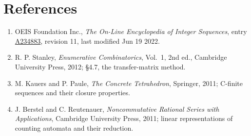 \documentclass[11pt]{article}
\theoremstyle{definition}
\begin{document}
\section{References}

\begin{enumerate}

\item OEIS Foundation Inc., \emph{The On-Line Encyclopedia of Integer Sequences}, entry \href{https://oeis.org/A234883}{A234883}, revision 11, last modified Jun 19 2022.

\item R. P. Stanley, \emph{Enumerative Combinatorics}, Vol.~1, 2nd ed., Cambridge University Press, 2012; \S4.7, the transfer-matrix method.

\item M. Kauers and P. Paule, \emph{The Concrete Tetrahedron}, Springer, 2011; C-finite sequences and their closure properties.

\item J. Berstel and C. Reutenauer, \emph{Noncommutative Rational Series with Applications}, Cambridge University Press, 2011; linear representations of counting automata and their reduction.

\end{enumerate}
\end{document}
